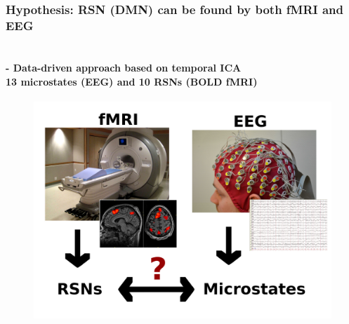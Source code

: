 \documentclass[9pt,presentation]{beamer}   %
\begin{document}
\begin{frame}[t]
\frametitle{Hypothesis: RSN (DMN) can be found by both fMRI and EEG}
\framesubtitle{\\ \cite{Yuan20122062} - Data-driven approach based on temporal ICA\\
13 microstates (EEG) and 10 RSNs (BOLD fMRI)}

\begin{figure}[H]
\begin{center}
\includegraphics[scale=0.135]{fmri_eeg}
\end{center}
\end{figure} 


\end{frame}
\end{document}
